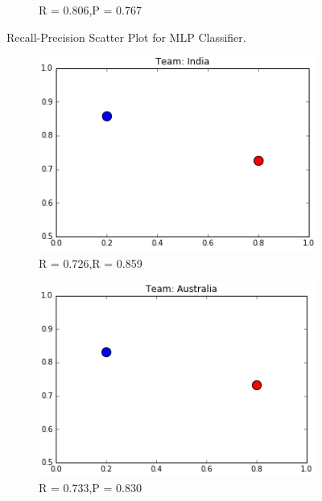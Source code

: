 \documentclass[a4paper, 10pt, conference]{IEEEtran}
\begin{document}
\begin{figure}[h!]
\begin{subfigure}[b]{0.4\linewidth}
    \caption{R = 0.806,P = 0.767}
  \end{subfigure}
  \caption{Recall-Precision Scatter Plot for MLP Classifier.}
  \label{fig:mlpclfPlots}
\end{figure}

\begin{figure}[h!]
  \centering
  \begin{subfigure}[b]{0.4\linewidth}
    \includegraphics[width=\linewidth]{DTCLF_India.png}
    \caption{R = 0.726,R = 0.859}
  \end{subfigure}
  \begin{subfigure}[b]{0.4\linewidth}
    \includegraphics[width=\linewidth]{DTCLF_Australia.png}
    \caption{R = 0.733,P = 0.830}
  \end{subfigure}
  \begin{subfigure}[b]{0.4\linewidth}

\end{subfigure}
\end{figure}
\end{document}
